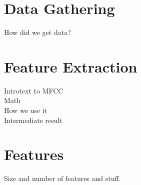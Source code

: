 \section{Data Gathering}

How did we get data?

\section{Feature Extraction}

Introtext to MFCC\\

Math\\

How we use it\\

Intermediate result\\

\section{Features}

Size and number of features and stuff.

